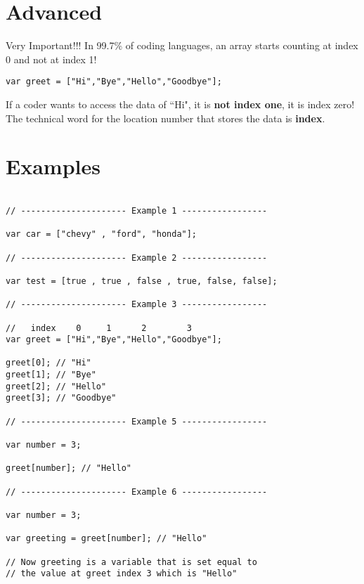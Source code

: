 \documentclass[12pt, letterpaper]{article}
\begin{document}
\section*{Advanced}

Very Important!!! In 99.7\% of coding languages, an array starts counting at index 0 and not at index 1!
\begin{lstlisting}
var greet = ["Hi","Bye","Hello","Goodbye"];
\end{lstlisting}
If a coder wants to access the data of ``Hi", it is \textbf{not index one}, it is index zero! The technical word for the location number that stores the data is \textbf{index}.

\section*{Examples}

\begin{lstlisting}

// --------------------- Example 1 -----------------

var car = ["chevy" , "ford", "honda"];

// --------------------- Example 2 -----------------

var test = [true , true , false , true, false, false];

// --------------------- Example 3 -----------------

//   index    0     1      2        3
var greet = ["Hi","Bye","Hello","Goodbye"];

greet[0]; // "Hi"
greet[1]; // "Bye"
greet[2]; // "Hello"
greet[3]; // "Goodbye"

// --------------------- Example 5 -----------------

var number = 3;

greet[number]; // "Hello"

// --------------------- Example 6 -----------------

var number = 3;

var greeting = greet[number]; // "Hello"

// Now greeting is a variable that is set equal to 
// the value at greet index 3 which is "Hello"


\end{lstlisting}
\end{document}
